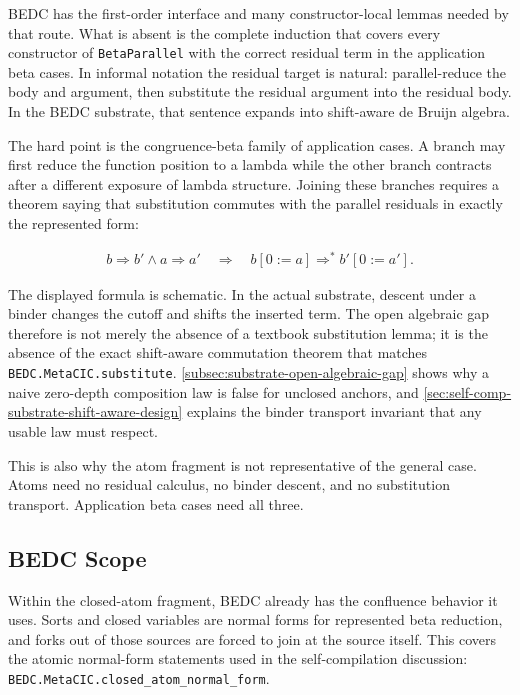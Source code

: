 BEDC has the first-order interface and many constructor-local lemmas needed by
that route. What is absent is the complete induction that covers every
constructor of \texttt{BetaParallel} with the correct residual term in the
application beta cases. In informal notation the residual target is natural:
parallel-reduce the body and argument, then substitute the residual argument
into the residual body. In the BEDC substrate, that sentence expands into
shift-aware de Bruijn algebra.

The hard point is the congruence-beta family of application cases. A branch
may first reduce the function position to a lambda while the other branch
contracts after a different exposure of lambda structure. Joining these
branches requires a theorem saying that substitution commutes with the
parallel residuals in exactly the represented form:

$$
\begin{aligned}
b \Rightarrow b'
\land
a \Rightarrow a'
\quad\Longrightarrow\quad
b[0 := a] \Rightarrow^\ast b'[0 := a'].
\end{aligned}
$$

The displayed formula is schematic. In the actual substrate, descent under a
binder changes the cutoff and shifts the inserted term. The open algebraic gap
therefore is not merely the absence of a textbook substitution lemma; it is the
absence of the exact shift-aware commutation theorem that matches
\texttt{BEDC.MetaCIC.substitute}. \autoref{subsec:substrate-open-algebraic-gap}
shows why a naive zero-depth composition law is false for unclosed anchors, and
\autoref{sec:self-comp-substrate-shift-aware-design} explains the binder
transport invariant that any usable law must respect.

This is also why the atom fragment is not representative of the general case.
Atoms need no residual calculus, no binder descent, and no substitution
transport. Application beta cases need all three.

\subsection{BEDC Scope}
\label{subsec:metacic-confluence-bedc-scope}

Within the closed-atom fragment, BEDC already has the confluence behavior it
uses. Sorts and closed variables are normal forms for represented beta
reduction, and forks out of those sources are forced to join at the source
itself. This covers the atomic normal-form statements used in the
self-compilation discussion:
\texttt{BEDC.MetaCIC.closed\_atom\_normal\_form}.

